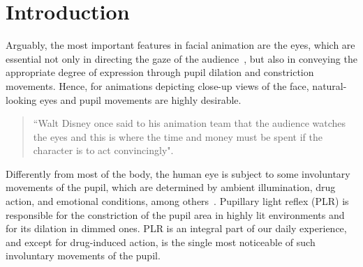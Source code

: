 \documentclass{acmtog} %
\begin{document}
\section{Introduction}
Arguably, the most important features in facial animation are the eyes,
which are essential not only in directing the gaze of the
audience~\cite{BLR-2007}, but also in conveying the appropriate degree
of expression through pupil dilation and constriction movements. Hence,
for animations depicting close-up views of the face, natural-looking
eyes and pupil movements are highly desirable.
 
\begin{quote}
``Walt Disney once said to his animation team that the audience watches
the eyes and this is where the time and money must be spent if the
character is to act convincingly".
\end{quote}

Differently from most of the body, the human eye is subject to some
involuntary movements of the pupil, which are determined by ambient
illumination, drug action, and emotional conditions, among
others~\cite{BDDG-03}. Pupillary light reflex (PLR) is responsible for
the constriction of the pupil area in highly lit environments and for
its dilation in dimmed ones. PLR is an integral part of our daily
experience, and except for drug-induced action, is the single most
noticeable of such involuntary movements of the pupil.
\end{document}
